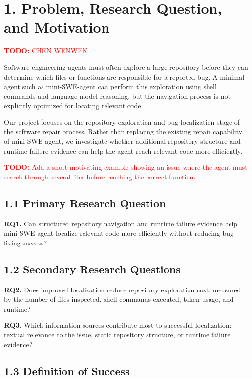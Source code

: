 \documentclass[11pt]{article}
\newcommand{\todo}[1]{%
    \textcolor{red}{\textbf{TODO:} #1}%
}
\begin{document}
\section*{1. Problem, Research Question, and Motivation}

\todo{CHEN WENWEN}

Software engineering agents must often explore a large repository before
they can determine which files or functions are responsible for a reported
bug. A minimal agent such as mini-SWE-agent can perform this exploration
using shell commands and language-model reasoning, but the navigation
process is not explicitly optimized for locating relevant code.

Our project focuses on the repository exploration and bug localization
stage of the software repair process. Rather than replacing the existing
repair capability of mini-SWE-agent, we investigate whether additional
repository structure and runtime failure evidence can help the agent
reach relevant code more efficiently.

\todo{Add a short motivating example showing an issue where the agent
must search through several files before reaching the correct function.}

\subsection*{1.1 Primary Research Question}

\textbf{RQ1.}
Can structured repository navigation and runtime failure evidence help
mini-SWE-agent localize relevant code more efficiently without reducing
bug-fixing success?

\subsection*{1.2 Secondary Research Questions}

\textbf{RQ2.}
Does improved localization reduce repository exploration cost, measured
by the number of files inspected, shell commands executed, token usage,
and runtime?

\vspace{0.5em}

\textbf{RQ3.}
Which information sources contribute most to successful localization:
textual relevance to the issue, static repository structure, or runtime
failure evidence?

\subsection*{1.3 Definition of Success}
\end{document}
